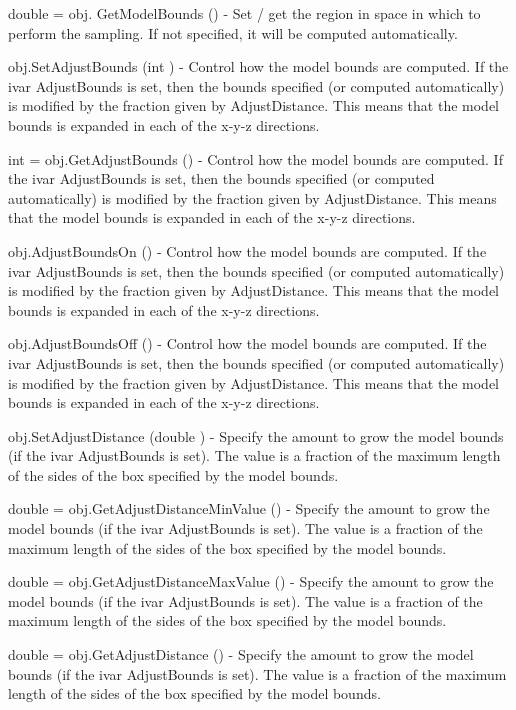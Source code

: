 \begin{DoxyItemize}
\item {\ttfamily double = obj. Get\-Model\-Bounds ()} -\/ Set / get the region in space in which to perform the sampling. If not specified, it will be computed automatically.  
\item {\ttfamily obj.\-Set\-Adjust\-Bounds (int )} -\/ Control how the model bounds are computed. If the ivar Adjust\-Bounds is set, then the bounds specified (or computed automatically) is modified by the fraction given by Adjust\-Distance. This means that the model bounds is expanded in each of the x-\/y-\/z directions.  
\item {\ttfamily int = obj.\-Get\-Adjust\-Bounds ()} -\/ Control how the model bounds are computed. If the ivar Adjust\-Bounds is set, then the bounds specified (or computed automatically) is modified by the fraction given by Adjust\-Distance. This means that the model bounds is expanded in each of the x-\/y-\/z directions.  
\item {\ttfamily obj.\-Adjust\-Bounds\-On ()} -\/ Control how the model bounds are computed. If the ivar Adjust\-Bounds is set, then the bounds specified (or computed automatically) is modified by the fraction given by Adjust\-Distance. This means that the model bounds is expanded in each of the x-\/y-\/z directions.  
\item {\ttfamily obj.\-Adjust\-Bounds\-Off ()} -\/ Control how the model bounds are computed. If the ivar Adjust\-Bounds is set, then the bounds specified (or computed automatically) is modified by the fraction given by Adjust\-Distance. This means that the model bounds is expanded in each of the x-\/y-\/z directions.  
\item {\ttfamily obj.\-Set\-Adjust\-Distance (double )} -\/ Specify the amount to grow the model bounds (if the ivar Adjust\-Bounds is set). The value is a fraction of the maximum length of the sides of the box specified by the model bounds.  
\item {\ttfamily double = obj.\-Get\-Adjust\-Distance\-Min\-Value ()} -\/ Specify the amount to grow the model bounds (if the ivar Adjust\-Bounds is set). The value is a fraction of the maximum length of the sides of the box specified by the model bounds.  
\item {\ttfamily double = obj.\-Get\-Adjust\-Distance\-Max\-Value ()} -\/ Specify the amount to grow the model bounds (if the ivar Adjust\-Bounds is set). The value is a fraction of the maximum length of the sides of the box specified by the model bounds.  
\item {\ttfamily double = obj.\-Get\-Adjust\-Distance ()} -\/ Specify the amount to grow the model bounds (if the ivar Adjust\-Bounds is set). The value is a fraction of the maximum length of the sides of the box specified by the model bounds.  

\end{DoxyItemize}
